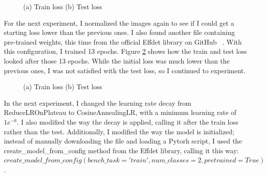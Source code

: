 \begin{figure}[!ht]
    \label{fig:fig26}
    \caption{(a) Train loss (b) Test loss}
\end{figure}
For the next experiment, I normalized the images again to see if I could get a starting loss lower than the previous ones. I also found another file containing pre-trained weights, this time from the official Effdet library on GitHub ~\cite{link7}. With this configuration, I trained 13 epochs. Figure \ref{fig:fig27} shows how the train and test loss looked after those 13 epochs.
While the initial loss was much lower than the previous ones, I was not satisfied with the test loss, so I continued to experiment.\\
\begin{figure}[!ht]
    \label{fig:fig27}
    \caption{(a) Train loss (b) Test loss}
\end{figure}
In the next experiment, I changed the learning rate decay from ReduceLROnPlateau to CosineAnnealingLR, with a minimum learning rate of \(1e^{-6}\). I also modified the way the decay is applied, calling it after the train loss rather than the test. Additionally, I modified the way the model is initialized; instead of manually downloading the file and loading a Pytorh script, I used the create\_model\_from\_config method from the Effdet library, calling it this way: \(create\_model\_from\_config(bench\_task='train', num\_classes=2, pretrained=True)\).\\
